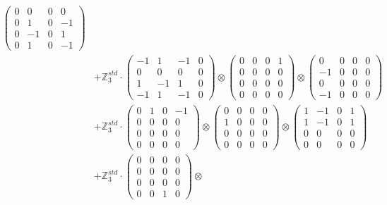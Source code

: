 \documentclass{article}
\begin{document}
{\begin{align}
            \begin{pmatrix} 0 & 0 & 0 & 0 \\ 0 & 1 & 0 & -1 \\ 0 & -1 & 0 & 1 \\ 0 & 1 & 0 & -1 \end{pmatrix} \\ 
        &+ \label{Rs16-Rc11-Solution-28-c25} \mathbb{Z}_3^{std} \cdot 
            \begin{pmatrix} -1 & 1 & -1 & 0 \\ 0 & 0 & 0 & 0 \\ 1 & -1 & 1 & 0 \\ -1 & 1 & -1 & 0 \end{pmatrix} \otimes 
            \begin{pmatrix} 0 & 0 & 0 & 1 \\ 0 & 0 & 0 & 0 \\ 0 & 0 & 0 & 0 \\ 0 & 0 & 0 & 0 \end{pmatrix} \otimes 
            \begin{pmatrix} 0 & 0 & 0 & 0 \\ -1 & 0 & 0 & 0 \\ 0 & 0 & 0 & 0 \\ -1 & 0 & 0 & 0 \end{pmatrix} \\ 
        &+ \label{Rs16-Rc11-Solution-28-c26} \mathbb{Z}_3^{std} \cdot 
            \begin{pmatrix} 0 & 1 & 0 & -1 \\ 0 & 0 & 0 & 0 \\ 0 & 0 & 0 & 0 \\ 0 & 0 & 0 & 0 \end{pmatrix} \otimes 
            \begin{pmatrix} 0 & 0 & 0 & 0 \\ 1 & 0 & 0 & 0 \\ 0 & 0 & 0 & 0 \\ 0 & 0 & 0 & 0 \end{pmatrix} \otimes 
            \begin{pmatrix} 1 & -1 & 0 & 1 \\ 1 & -1 & 0 & 1 \\ 0 & 0 & 0 & 0 \\ 0 & 0 & 0 & 0 \end{pmatrix} \\ 
        &+ \label{Rs16-Rc11-Solution-28-c27} \mathbb{Z}_3^{std} \cdot 
            \begin{pmatrix} 0 & 0 & 0 & 0 \\ 0 & 0 & 0 & 0 \\ 0 & 0 & 0 & 0 \\ 0 & 0 & 1 & 0 \end{pmatrix} \otimes 

\end{align}}
\end{document}
